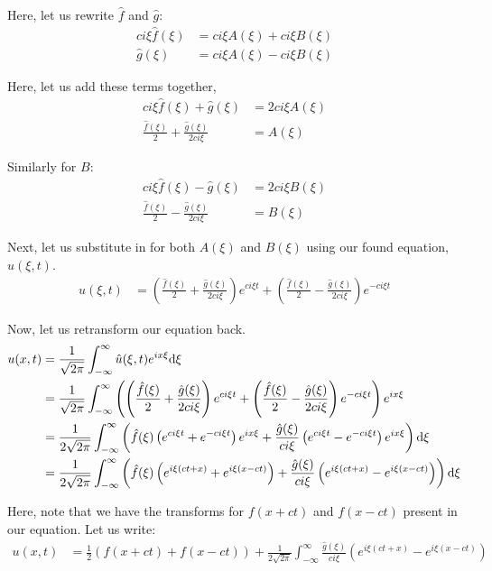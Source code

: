 Here, let us rewrite $\hat f$ and $\hat g$:
%
\begin{align}
  c i \xi \hat f(\xi) & = c i \xi A(\xi) + c i \xi B(\xi)\\
  \hat g(\xi) & = c i \xi A(\xi) - c i \xi B(\xi)
\end{align}

Here, let us add these terms together,
%
\begin{align}
  c i \xi \hat f(\xi) + \hat g(\xi) & = 2 c i \xi A(\xi)\\
  \frac{\hat f(\xi)}{2} + \frac{\hat g(\xi)}{2 ci \xi} & = A(\xi)
\end{align}

Similarly for $B$:
%
\begin{align}
  c i \xi \hat f(\xi) - \hat g(\xi) & = 2 c i \xi B(\xi)\\
  \frac{\hat f(\xi)}{2} - \frac{\hat g(\xi)}{2 ci \xi} & = B(\xi)
\end{align}

Next, let us substitute in for both $A(\xi)$ and $B(\xi)$ using our found equation, $\hat u(\xi, t)$.
%
\begin{align}
  \hat u(\xi, t) & =
  \left( \frac{\hat f(\xi)}{2} + \frac{\hat g(\xi)}{2 c i \xi} \right)e^{c i \xi t} +
  \left( \frac{\hat f(\xi)}{2} - \frac{\hat g(\xi)}{2 c i \xi} \right) e^{-c i \xi t}
\end{align}

Now, let us retransform our equation back.
%
\begin{align}
  u(x, t)
  & = \frac{1}{\sqrt{2 \pi}} \int^\infty_{-\infty}
  \hat u(\xi, t) e^{i x \xi} \text d\xi\\
  & = \frac{1}{\sqrt{2 \pi}} \int^\infty_{-\infty}
  \left(\left( \frac{\hat f(\xi)}{2} + \frac{\hat g(\xi)}{2 c i \xi} \right)e^{c i \xi t} +
  \left( \frac{\hat f(\xi)}{2} - \frac{\hat g(\xi)}{2 c i \xi} \right) e^{-c i \xi t}\right) e^{i x \xi}\\
  & = \frac{1}{2 \sqrt{2 \pi}} \int^\infty_{-\infty}
  \left( \hat f(\xi)\left(e^{c i \xi t} + e^{-c i \xi t} \right)e^{i x \xi} + \frac{\hat g(\xi)}{c i \xi}\left( e^{c i \xi t} - e^{-c i \xi t} \right) e^{i x \xi} \right) \text d\xi\\
  & =
  \frac{1}{2 \sqrt{2 \pi}} \int^\infty_{-\infty}
  \left(
  \hat f(\xi)\left(e^{i \xi(c t + x)} + e^{i \xi (x - c t)} \right) +
  \frac{\hat g(\xi)}{c i \xi}\left( e^{i \xi(c t + x)} - e^{i \xi (x - c t)} \right) \right) \text d\xi
\end{align}

Here, note that we have the transforms for $f(x+ct)$ and $f(x - ct)$ present in our equation. Let us write:
%
\begin{align}
  u(x, t) & = \frac{1}{2} \left(f(x + ct) + f(x - ct)\right) + \frac{1}{2 \sqrt{2 \pi}} \int^\infty_{-\infty}
  \frac{\hat g(\xi)}{c i \xi}\left( e^{i \xi(c t + x)} - e^{i \xi (x - c t)} \right)
\end{align}
